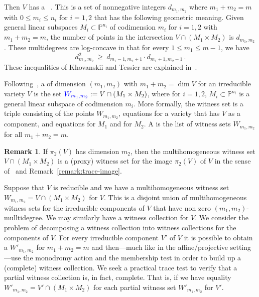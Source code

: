\documentclass[12pt]{amsart}
\theoremstyle{definition}
\newtheorem{remark}[theorem]{Remark}
\begin{document}
Then $V$ has a {{{}}}~\cite[Ch.~19]{Harris}.
This is a set of nonnegative integers $d_{m_1,m_2}$ where $m_1+m_2=m$ with $0\leq m_i\leq n_i$ for
$i=1,2$ that has the following geometric meaning.
Given general linear subspaces $M_i\subset{{\mathbb{P}}}^{n_i}$ of codimension $m_i$ for $i=1,2$ with
$m_1+m_2=m$, the number of points in the intersection $V\cap (M_1\times M_2)$ is $d_{m_1,m_2}$.
These multidegrees are log-concave in that for every $1\leq m_1\leq m{-}1$, we have
 \begin{equation}\label{Eq:log-concave}
   d_{m_1,m_2}^2\ \geq\ d_{m_1-1,m_2+1}\cdot d_{m_1+1,m_2-1}\,.
 \end{equation}
These inequalities of Khovanskii and Tessier are explained in~\cite[Ex.~1.6.4]{Laz}.

Following~\cite{HR15}, a {{{}}} of dimension $(m_1,m_2)$ with $m_1+m_2=\dim V$
for an irreducible variety $V$ is the set ${{\color{blue}{W_{m_1,m_2}}}}:=V\cap(M_1\times M_2)$, where for $i=1,2$,
$M_i\subset{{\mathbb{P}}}^{n_i}$ is a general linear subspace of codimension $m_i$.
More formally, the witness set is a triple consisting of the points $W_{m_1,m_2}$,
equations for a variety that has $V$ as a component, and equations for  $M_1$ and for $M_2$.
A {{{}}} is the list of witness sets $W_{m_1,m_2}$ for all $m_1+m_2=m$.

\begin{remark}\label{R:WitnessProj}
 If $\pi_2(V)$ has dimension $m_2$, then the multihomogeneous witness set $V\cap(M_1\times M_2)$ is a (proxy) witness
 set for the image $\pi_2(V)$ of $V$ in the sense of~\cite{WitnessProj} and Remark~\ref{remark:trace-image}.
\end{remark}

Suppose that $V$ is reducible and we have a multihomogeneous witness set $W_{m_1,m_2}=V\cap(M_1\times M_2)$ for
$V$.
This is a disjoint union of multihomogeneous witness sets for the irreducible components of $V$ that have non zero
$(m_1,m_2)$-mulltidegree.
We may similarly have a witness collection for $V$.
We consider the problem of decomposing a witness collection into witness collections for the components
of $V$.
For every irreducible component $V'$ of $V$ it is possible to obtain a {{{}}}
$W'_{m_1,m_2}$ for $m_1+m_2=m$ and then---much like in the affine/projective setting---use the monodromy
action and the membership test in order to build up a (complete) witness collection.
We seek a practical trace test to verify that a partial witness collection is, in fact, complete.
That is, if we have equality  $W'_{m_1,m_2}=V'\cap(M_1\times M_2)$ for each partial witness set $W'_{m_1,m_2}$
for $V'$.
\end{document}
